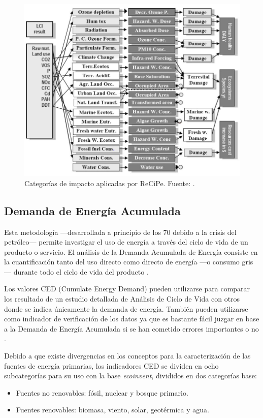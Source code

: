 \begin{figure}[!htb]
\centering
\includegraphics[width=12cm]{img/recipecategoriasimpacto.png}
\caption[Categorías de impacto aplicadas por ReCiPe.]{Categorías de impacto aplicadas por ReCiPe. Fuente: \protect\cite{mgoedkoop3}.}
\label{fig:recipecategoriasimpacto}
\end{figure}

\subsection{Demanda de Energía Acumulada}

Esta metodología —desarrollada a principio de los 70 debido a la crisis del petróleo— permite investigar el uso de energía a través del ciclo de vida de un producto o servicio. El análisis de la Demanda Acumulada de Energía consiste en la cuantificación tanto del uso directo como directo de energía —o consumo gris— durante todo el ciclo de vida del producto \cite{ecoinventlcia}.

Los valores CED (Cumulate Energy Demand) pueden utilizarse para comparar los resultado de un estudio detallada de Análisis de Ciclo de Vida con otros donde se indica únicamente la demanda de energía. También pueden utilizarse como indicador de verificación de los datos ya que es bastante fácil juzgar en base a la Demanda de Energía Acumulada si se han cometido errores importantes o no \cite{ecoinventlcia}.

Debido a que existe divergencias en los conceptos para la caracterización de las fuentes de energía primarias, los indicadores CED se dividen en ocho subcategorías para su uso con la base \textit{ecoinvent}, divididos en dos categorías base:
\begin{itemize}
  \item Fuentes no renovables: fósil, nuclear y bosque primario.
  \item Fuentes renovables: biomasa, viento, solar, geotérmica y agua.
\end{itemize}

